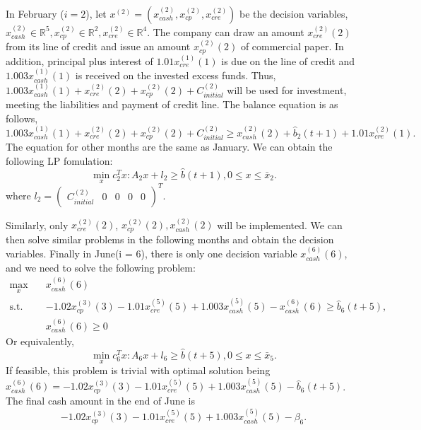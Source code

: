     In February ($i = 2$), let $x^{(2)}=(x^{(2)}_{cash}, x^{(2)}_{cp}, x^{(2)}_{cre})$ be the decision variables, $x^{(2)}_{cash}\in\mathbb{R}^5, x^{(2)}_{cp}\in\mathbb{R}^2, x^{(2)}_{cre}\in\mathbb{R}^4$. The company can draw an amount $x^{(2)}_{cre}(2)$ from its line of credit and issue an amount $x^{(2)}_{cp}(2)$ of commercial paper. In addition, principal plus interest of $1.01x^{(1)}_{cre}(1)$ is due on the line of credit and $1.003x^{(1)}_{cash}(1)$ is received on the invested excess funds. Thus, $1.003x^{(1)}_{cash}(1)+x^{(2)}_{cre}(2)+x^{(2)}_{cp}(2)+C^{(2)}_{initial}$ will be used for investment, meeting the liabilities and payment of credit line. The balance equation is as follows, 
        \[
            1.003x^{(1)}_{cash}(1)+x^{(2)}_{cre}(2)+x^{(2)}_{cp}(2)+C^{(2)}_{initial}\geq x^{(2)}_{cash}(2) + \hat{b}_2(t+1)+1.01x^{(2)}_{cre}(1).
        \]
    The equation for other months are the same as January. We can obtain the following LP fomulation:
    \begin{equation}\label{eq:naiveFeb}
        \min_x c_2^Tx: A_2x+l_2\geq\hat{b}(t+1), 0\leq x\leq \bar{x}_2.
    \end{equation}
    where $l_2 = \begin{pmatrix}C^{(2)}_{initial} & 0& 0& 0& 0\end{pmatrix}^T$.

    Similarly, only $x^{(2)}_{cre}(2)$, $x^{(2)}_{cp}(2), x^{(2)}_{cash}(2)$ will be implemented. We can then solve similar problems in the following months and obtain the decision variables. Finally in June(i = 6), there is only one decision variable $x^{(6)}_{cash}(6)$, and we need to solve the following problem:
    \[
        \begin{split}
            \max_{x} \quad & x^{(6)}_{cash}(6) \\
            \text{s.t.} \quad 
            & - 1.02x^{(3)}_{cp}(3) - 1.01x^{(5)}_{cre}(5) + 1.003x^{(5)}_{cash}(5) - x^{(6)}_{cash}(6) \geq \hat{b}_6(t+5),  \\
            & x^{(6)}_{cash}(6)\geq 0
        \end{split}
    \]
    Or equivalently,
    \begin{equation}\label{eq:naiveJune}
        \min_x c_6^Tx: A_6x+l_6\geq\hat{b}(t+5), 0\leq x\leq \bar{x}_5.
    \end{equation}
    If feasible, this problem is trivial with optimal solution being $x^{(6)}_{cash}(6) = - 1.02x^{(3)}_{cp}(3) - 1.01x^{(5)}_{cre}(5) + 1.003x^{(5)}_{cash}(5) - \hat{b}_6(t+5)$. The final cash amount in the end of June is 
    \[- 1.02x^{(3)}_{cp}(3) - 1.01x^{(5)}_{cre}(5) + 1.003x^{(5)}_{cash}(5) - \beta_6.\]

